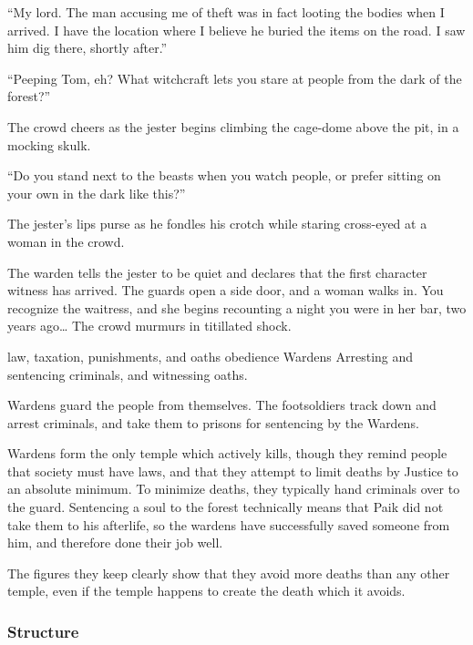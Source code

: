 \begin{multicols}{2}
{    ``My lord.
    The man accusing me of theft was in fact looting the bodies when I arrived.
    I have the location where I believe he buried the items on the road.
    I saw him dig there, shortly after.''

    {\sffamily ``Peeping Tom, eh?
    What witchcraft lets you stare at people from the dark of the forest?''}

    The crowd cheers as the jester begins climbing the cage-dome above the pit, in a mocking skulk.

    {\sffamily ``Do you stand next to the beasts when you watch people, or prefer sitting on your own in the dark like this?''}

    The jester's lips purse as he fondles his crotch while staring cross-eyed at a woman in the crowd.

    The warden tells the jester to be quiet and declares that the first character witness has arrived.
    The guards open a side door, and a woman walks in.
    You recognize the waitress, and she begins recounting a night you were in her bar, two years ago\ldots
    The crowd murmurs in titillated shock.
  }%
  {law, taxation, punishments, and oaths}%
  {obedience}%
  {Wardens}%
  {
    Arresting and sentencing criminals, and witnessing oaths.
  }%

Wardens guard the people from themselves.
The footsoldiers track down and arrest criminals, and take them to prisons for sentencing by the Wardens.

Wardens form the only temple which actively kills, though they remind people that society must have laws, and that they attempt to limit deaths by Justice to an absolute minimum.
To minimize deaths, they typically hand criminals over to the \gls{guard}.
Sentencing a soul to the forest technically means that Paik did not take them to his afterlife, so the wardens have successfully saved someone from him, and therefore done their job well.

The figures they keep clearly show that they avoid more deaths than any other temple, even if the temple happens to create the death which it avoids.

\subsubsection{Structure}


\end{multicols}
